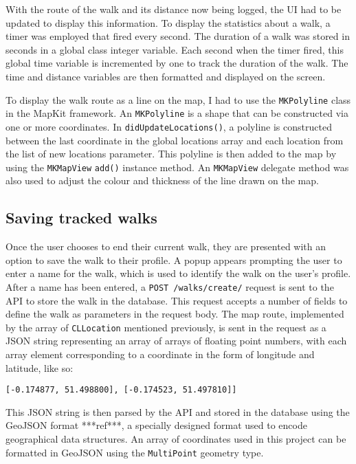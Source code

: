 With the route of the walk and its distance now being logged, the UI had to be updated to display this information. To display the statistics about a walk, a timer was employed that fired every second. The duration of a walk was stored in seconds in a global class integer variable. Each second when the timer fired, this global time variable is incremented by one to track the duration of the walk. The time and distance variables are then formatted and displayed on the screen.

To display the walk route as a line on the map, I had to use the \verb|MKPolyline| class in the MapKit framework. An \verb|MKPolyline| is a shape that can be constructed via one or more coordinates. In \verb|didUpdateLocations()|, a polyline is constructed between the last coordinate in the global locations array and each location from the list of new locations parameter. This polyline is then added to the map by using the \verb|MKMapView| \verb|add()| instance method. An \verb|MKMapView| delegate method was also used to adjust the colour and thickness of the line drawn on the map.

\subsection{Saving tracked walks}

Once the user chooses to end their current walk, they are presented with an option to save the walk to their profile. A popup appears prompting the user to enter a name for the walk, which is used to identify the walk on the user's profile. After a name has been entered, a \verb|POST /walks/create/| request is sent to the API to store the walk in the database. This request accepts a number of fields to define the walk as parameters in the request body. The map route, implemented by the array of \verb|CLLocation| mentioned previously, is sent in the request as a JSON string representing an array of arrays of floating point numbers, with each array element corresponding to a coordinate in the form of longitude and latitude, like so:

\begin{center}
  \verb|[-0.174877, 51.498800], [-0.174523, 51.497810]]|
\end{center}

This JSON string is then parsed by the API and stored in the database using the GeoJSON format ***ref***, a specially designed format used to encode geographical data structures. An array of coordinates used in this project can be formatted in GeoJSON using the \verb|MultiPoint| geometry type.

